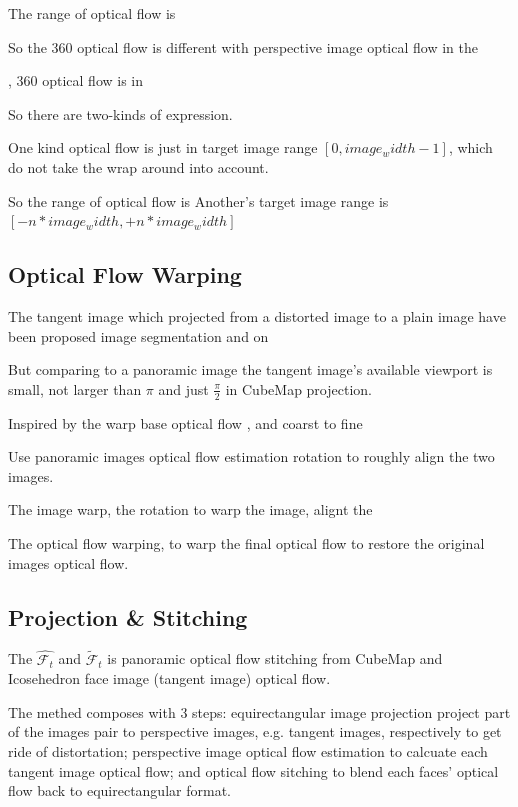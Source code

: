 The range of optical flow is 

So the 360 optical flow is different with perspective image optical flow in the 

, 360 optical flow is  in 

So there are two-kinds of expression.

One kind optical flow is just in target image range $[0, image_width - 1]$, which do not take the wrap around into account.

So the range of optical flow is 
Another's target image range is $[- n * image_width, + n * image_width]$


\subsection{Optical Flow Warping}

The tangent image which projected from a distorted image to a plain image have been proposed image segmentation and on ~\cite{eldercvpr2020}

But comparing to a panoramic image the tangent image's available viewport is small, not larger than $\pi$ and just $\frac{\pi}{2}$ in CubeMap projection.

Inspired by the warp base optical flow \cite{?}, and coarst to fine 

Use panoramic images optical flow estimation rotation to roughly align the two images.


The image warp, the rotation to warp the image, alignt the 

The optical flow warping, to warp the final optical flow to restore the original images optical flow.


\subsection{Projection \& Stitching}


The $\hat{\mathcal{F}_t}$ and $\tilde{\mathcal{F}}_t$ is panoramic optical flow stitching from CubeMap and Icosehedron face image (tangent image) optical flow.

The methed composes with 3 steps:
 equirectangular image projection project part of the images pair to perspective images, e.g. tangent images, respectively to get ride of distortation;
 perspective image optical flow estimation to calcuate each tangent image optical flow;
 and optical flow sitching to blend each faces' optical flow back to equirectangular format. 
 
